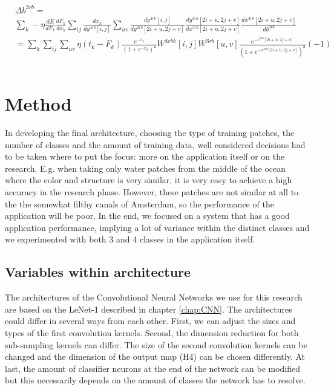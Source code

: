 \documentclass[a4paper,onecolumn]{report}
\begin{document}
\begin{small}
\begin{equation}
\begin{split}
	&\Delta b^{3rb} =\\
	&\sum_{k} - \eta  \frac{dE}{dF_{k}} 
	\frac{dF_{k}}{dx_{k}} 
	\sum_{ij} \frac{dx_{k}}{dy^{4rb}[i,j]} 
	\sum_{uv}\frac{dy^{4rb}[i,j]}{d y^{3rb} [2i+u,2j+v]} 
	\frac{d y^{3rb} [2i+u,2j+v]}{d x^{3rb}[2i+u,2j+v]}
	\frac{d x^{3rb}[2i+u,2j+v]}{d b^{3rb}} \\
	&=\sum_{k} \sum_{ij} \sum_{uv} \eta (t_{k}-F_{k})\frac{e^{-x_{k}}}{(1+e^{-x_{k}})^{2}} W^{4rbk}[i,j]  W^{3rb}[u,v] \frac{e^{-x^{3rb}[2i+u,2j+v]}}{(1+e^{-x^{3rb}[2i+u,2j+v]})^2} (-1)
\end{split}
\end{equation}
\end{small}
\begin{small}
\begin{equation}
\end{equation}
\end{small}


\chapter{Method}
\label{chap:method}
In developing the final architecture, choosing the type of training patches, the number of classes and the amount of training data, well considered decisions had to be taken where to put the focus: more on the application itself or on the research. E.g. when taking only water patches from the middle of the ocean where the color and structure is very similar, it is very easy to achieve a high accuracy in the research phase. However, these patches are not similar at all to the the somewhat filthy canals of Amsterdam, so the performance of the application will be poor. In the end, we focused on a system that has a good application performance, implying a lot of variance within the distinct classes and we experimented with both 3 and 4 classes in the application itself. 

\section{Variables within architecture}
The architectures of the Convolutional Neural Networks we use for this research are based on the LeNet-1 described in chapter \ref{chap:CNN}. The architectures could differ in several ways from each other. First, we can adjust the sizes and types of the first convolution kernels. Second, the dimension reduction for both sub-sampling kernels can differ. The size of the second convolution kernels can be changed and the dimension of the output map (H4) can be chosen differently. At last, the amount of classifier neurons at the end of the network can be modified but this necessarily depends on the amount of classes the network has to resolve. 
\end{document}
